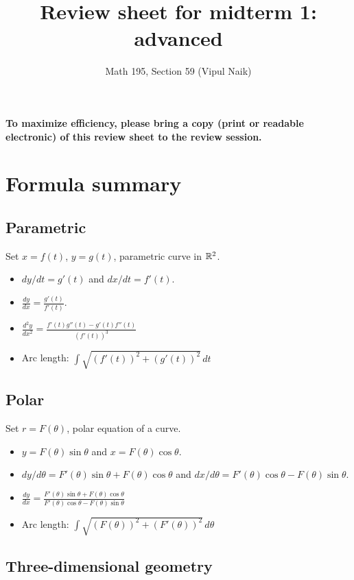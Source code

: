 \documentclass[10pt]{amsart}
\title{Review sheet for midterm 1: advanced}
\author{Math 195, Section 59 (Vipul Naik)}
\begin{document}
\maketitle

{\bf To maximize efficiency, please bring a copy (print or readable
electronic) of this review sheet to the review session.}

\section{Formula summary}

\subsection{Parametric}

Set $x = f(t)$, $y = g(t)$, parametric curve in $\mathbb{R}^2$.
\begin{itemize}
\item $dy/dt = g'(t)$ and $dx/dt = f'(t)$.
\item $\frac{dy}{dx} = \frac{g'(t)}{f'(t)}$.
\item $\frac{d^2y}{dx^2} = \frac{f'(t)g''(t) - g'(t)f''(t)}{(f'(t))^3}$
\item Arc length: $\int \sqrt{(f'(t))^2 + (g'(t))^2} \, dt$
\end{itemize}

\subsection{Polar}

Set $r = F(\theta)$, polar equation of a curve.

\begin{itemize}
\item $y = F(\theta)\sin \theta$ and $x = F(\theta)\cos \theta$.
\item $dy/d\theta = F'(\theta)\sin \theta + F(\theta)\cos \theta$ and
  $dx/d\theta = F'(\theta) \cos \theta - F(\theta) \sin \theta$.
\item $\frac{dy}{dx} = \frac{F'(\theta)\sin \theta + F(\theta)\cos
  \theta}{F'(\theta)\cos \theta - F(\theta)\sin \theta}$
\item Arc length: $\int \sqrt{(F(\theta))^2 + (F'(\theta))^2} \,
  d\theta$
\end{itemize}

\subsection{Three-dimensional geometry}
\end{document}
